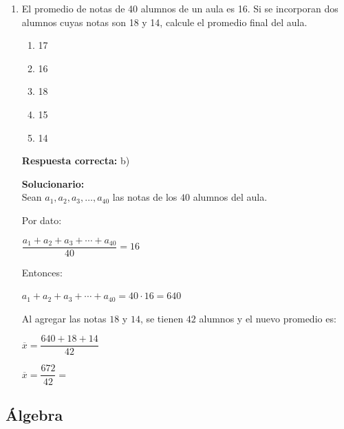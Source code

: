 \begin{enumerate}
	Cantidad de obreros:
	
	$70\%\,(500)=350$
	
	Cantidad de obreros despedidos:
	
	$20\%\,(350)=70$
	
	Cantidad de obreros que quedan:
	
	$350-70=280$
	
	Cantidad de obreros contratados:
	
	$30\%\,(280)=84$
	
	Cantidad de obreros que trabajan al final:
	
	
	\vspace{6mm}
	
	\item El promedio de notas de 40 alumnos de un aula es 16. Si se incorporan dos alumnos cuyas notas son 18 y 14, calcule el promedio final del aula.
	\begin{enumerate}[label=\alph*)]
		\item 17
		\item 16
		\item 18
		\item 15
		\item 14
	\end{enumerate}
	\textbf{Respuesta correcta:} b)
	
	\vspace{2mm}
\textbf{Solucionario:}\\
Sean $a_1,a_2,a_3,\ldots,a_{40}$ las notas de los $40$ alumnos del aula.

Por dato:

$\dfrac{a_1+a_2+a_3+\cdots+a_{40}}{40}=16$

Entonces:

$a_1+a_2+a_3+\cdots+a_{40}=40\cdot 16=640$

Al agregar las notas $18$ y $14$, se tienen $42$ alumnos y el nuevo promedio es:

$\overline{x}=\dfrac{640+18+14}{42}$

$\overline{x}=\dfrac{672}{42}=$ 
	
	\vspace{6mm}
	
\end{enumerate}

\subsection*{Álgebra}

